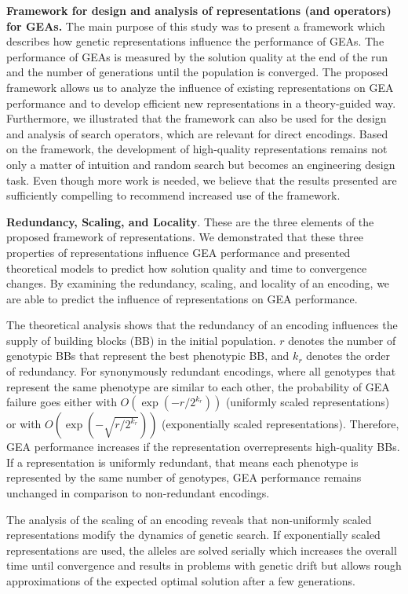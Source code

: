 {\bf Framework for design and analysis of representations (and operators) for GEAs.} The main purpose of this study was to present a  framework which describes how genetic representations influence the performance of GEAs. The performance of GEAs is measured by the solution quality at the end of the run and the number of generations until the population is converged. 
The proposed framework allows us to analyze the influence of existing representations on GEA performance and to develop efficient new representations in a theory-guided way.
Furthermore, we illustrated that the framework can also be used for the design and analysis of search operators, which are relevant for direct encodings.
Based on the framework, the development of high-quality representations remains not only a matter of intuition and random search but becomes an engineering design task.
Even though more work is needed, we believe that the results presented are sufficiently compelling to recommend increased use of the framework.



{\bf Redundancy, Scaling, and Locality}. These are the three elements of the proposed framework of representations.  We demonstrated that these three properties of representations influence GEA performance and presented theoretical models to predict how solution quality and time to convergence changes.
By examining the redundancy, scaling, and locality of an encoding, we are able to predict the influence of representations on GEA performance.

The theoretical analysis shows that the redundancy of an encoding influences the supply of building blocks (BB) in the initial population. $r$ denotes the number of genotypic BBs that represent the best phenotypic BB, and $k_r$ denotes the order of redundancy. For synonymously redundant encodings, where all genotypes that represent the same phenotype are similar to each other, the probability of GEA failure goes either with  $O(\exp(-r/2^{k_r}))$ (uniformly scaled representations) or  with $O(\exp(-\sqrt{r/2^{k_r}}))$ (exponentially scaled representations).
Therefore, GEA performance increases if the representation overrepresents high-quality BBs. If a representation is uniformly redundant, that means each phenotype is represented by the same number of genotypes, GEA performance remains unchanged in comparison to non-redundant encodings.

The analysis of the scaling of an encoding reveals that non-uniformly scaled representations modify the dynamics of genetic search. If exponentially scaled representations are used, the alleles are solved serially which increases the overall time until convergence and results in problems with genetic drift but allows rough approximations of the expected optimal solution after a few generations.

